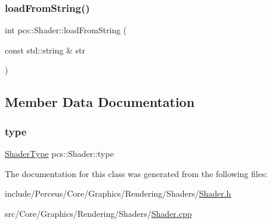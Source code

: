 \mbox{\label{classpcs_1_1Shader_a90d9850fa70aa206994b1671ef36e805}} 
\subsubsection{\texorpdfstring{load\+From\+String()}{loadFromString()}}
{\footnotesize\ttfamily int pcs\+::\+Shader\+::load\+From\+String (\begin{DoxyParamCaption}\item[{const std\+::string \&}]{str }\end{DoxyParamCaption})}



\subsection{Member Data Documentation}
\mbox{\label{classpcs_1_1Shader_a0f8b1769a66ad5d63b4357287ff0f6f8}} 
\subsubsection{\texorpdfstring{type}{type}}
{\footnotesize\ttfamily \hyperlink{namespacepcs_a2f6dfe5fadf3611302a9b7259502c3c9}{Shader\+Type} pcs\+::\+Shader\+::type\hspace{0.3cm}{\ttfamily [private]}}



The documentation for this class was generated from the following files\+:\begin{DoxyCompactItemize}
\item 
include/\+Perceus/\+Core/\+Graphics/\+Rendering/\+Shaders/\hyperlink{Shader_8h}{Shader.\+h}\item 
src/\+Core/\+Graphics/\+Rendering/\+Shaders/\hyperlink{Shader_8cpp}{Shader.\+cpp}\end{DoxyCompactItemize}
